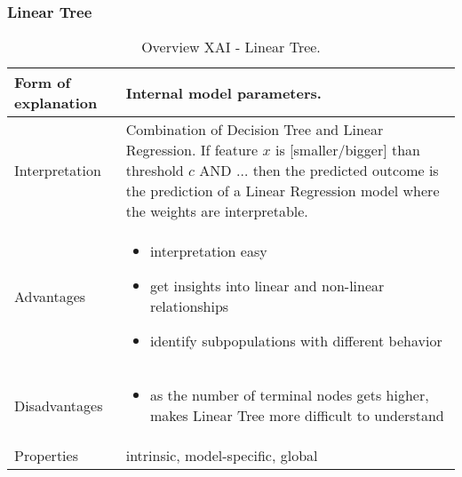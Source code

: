 \subsubsection{Linear Tree}
\begin{table}[H]
  \centering
  \begin{tabular}{|p{}|p{}|}
    \hline
    Form of \newline explanation & 
    Internal model parameters. \\
    
    \hline
    Interpretation & 
    Combination of Decision Tree and Linear Regression. If feature $x$ is [smaller/bigger] than threshold $c$ AND $\dots$ then the predicted outcome is the prediction of a Linear Regression model where the weights are interpretable.\\
 
    \hline
    Advantages &
    \begin{itemize}[nosep, left=0em]
        \item interpretation easy
        \item get insights into linear and non-linear relationships
        \item identify subpopulations with different behavior
    \end{itemize} \\
    
    \hline
    Disadvantages &
    \begin{itemize}[nosep, left=0em]
        \item as the number of terminal nodes gets higher,  makes Linear Tree more difficult to understand
    \end{itemize} \\
    
    \hline
    Properties & 
    intrinsic, model-specific, global  \\
    
    \hline
  \end{tabular}
  \caption[Overview XAI - Linear Tree]{Overview XAI - Linear Tree.\cite{linear_tree}}
\end{table}


